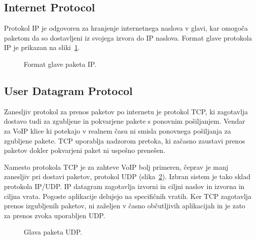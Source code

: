 \documentclass{acm_proc_article-sp}
\begin{document}
\subsection{Internet Protocol}

Protokol IP je odgovoren za hranjenje internetnega naslova v glavi, kar omogoča paketom da so dostavljeni iz svojega izvora do IP naslova. Format glave protokola IP je prikazan na sliki~\ref{fig:ip}.

\begin{figure}
\centering
{} %
\caption{Format glave paketa IP.}
\label{fig:ip}
\end{figure}


\subsection{User Datagram Protocol}
Zanesljiv protokol za prenos paketov po internetu je protokol TCP, ki zagotavlja dostavo tudi za zgubljene in pokvarjene pakete s ponovnim pošiljanjem. Vendar za VoIP klice ki potekajo v realnem času ni smisla ponovnega pošiljanja za zgubljene pakete. TCP uporablja nadzorom pretoka, ki začasno zaustavi prenos paketov dokler pokvarjeni paket ni uspešno prenešen.

Namesto protokola TCP je za zahteve VoIP bolj primeren, čeprav je manj zanesljiv pri dostavi paketov, protokol UDP (slika~\ref{fig:udp}). Izbran sistem je tako sklad protokola IP/UDP. IP datagram zagotavlja izvorni in ciljni naslov in izvorna in ciljna vrata. Pogoste aplikacije delujejo na specifičnih vratih. Ker TCP zagotavlja prenos izgubljenih paketov, ni zaželjen v časno občutljivih aplikacijah in je zato za prenos zvoka uporabljen UDP.

\begin{figure}
\centering
{} %
\caption{Glava paketa UDP.}
\label{fig:udp}
\end{figure}
\end{document}
